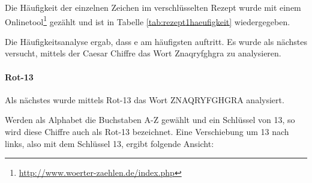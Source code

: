%
%
%

Die Häufigkeit der einzelnen Zeichen im verschlüsselten Rezept wurde mit einem
Onlinetool\footnote{\url{http://www.woerter-zaehlen.de/index.php}} gezählt und
ist in Tabelle \ref{tab:rezept1haeufigkeit} wiedergegeben.

Die Häufigkeitsanalyse ergab, dass \glqq{}e\grqq{} am häufigsten auftritt.
Es wurde als nächstes versucht, mittels der Caesar Chiffre das Wort
\glqq{}Znaqryfghgra\grqq{} zu analysieren.

\paragraph{Rot-13}

Als nächstes wurde mittels Rot-13 das Wort \glqq{}ZNAQRYFGHGRA\grqq{} analysiert.

Werden als Alphabet die Buchstaben A-Z gewählt und ein Schlüssel von 13, so wird
diese Chiffre auch als Rot-13 bezeichnet. Eine Verschiebung um 13 nach links,
also mit dem Schlüssel 13, ergibt folgende Ansicht:

